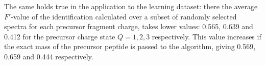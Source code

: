The same holds true in the application to the learning dataset: there
the average $F'$-value of the identification
calculated over a subset of randomly selected spectra for each
precursor fragment charge, takes lower  values: 0.565, 0.639 and 0.412
for the precursor charge state $Q=1,2,3$ respectively.
This value increases if the exact mass of the precursor peptide is passed
to the algorithm, giving 0.569, 0.659 and 0.444 respectively.
%
%
%
%

